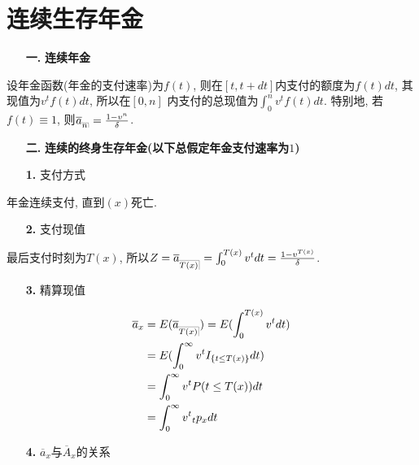 \documentclass[a4paper,10pt]{ctexbook}
\makeatletter
\newcommand{\hei}{\CJKfamily{hei}}      %
\DeclareRobustCommand{\annu}[1]{_{%
    \def\arraystretch{0}%
    \setlength\arraycolsep{1pt}%
    \setlength\arrayrulewidth{.2pt}%
    \begin{array}[b]{@{}c|}\hline
        \\[\arraycolsep]%
        \scriptstyle #1%
    \end{array}%
}}
\makeatother
\begin{document}
\section{连续生存年金}
\begin{itemize}
    \item[{\bf\hei 一.}]{\bf\hei 连续年金}
\end{itemize}

设年金函数(年金的支付速率)为$f(t)$, 则在$[t,t+dt]$内支付的额度为$f(t)dt$, 其现值为$v^tf(t)dt$, 所以在$[0,n]$ 内支付的总现值为$\int_0^n v^tf(t)dt$. 特别地, 若$f(t) \equiv 1$, 则$\overline{a}_{\annu n} = \frac{1-v^n}{\delta}$.

\begin{itemize}
    \item[{\bf\hei 二.}]{\bf\hei 连续的终身生存年金(以下总假定年金支付速率为$1$)}
\end{itemize}

\begin{itemize}
    \item[{\bf\hei 1.}] 支付方式
\end{itemize}

年金连续支付, 直到$(x)$死亡.

\begin{itemize}
    \item[{\bf\hei 2.}] 支付现值
\end{itemize}

最后支付时刻为$T(x)$, 所以$Z = \overline{a}_{\annu{T(x)}} = \int_0^{T(x)} v^tdt = \frac{1-v^{T(x)}}{\delta}$.

\begin{itemize}
    \item[{\bf\hei 3.}] 精算现值
\end{itemize}

\begin{align*}
    \overline{a}_x & = E(\overline{a}_{\annu{T(x)}}) = E(\int_0^{T(x)} v^tdt) \\
                   & = E(\int_0^{\infty} v^tI_{\{t \leq T(x)\}}dt)            \\
                   & = \int_0^{\infty} v^tP(t \leq T(x))dt                    \\
                   & = \int_0^{\infty} v^t{}_{t}p_xdt
\end{align*}

\begin{itemize}
    \item[{\bf\hei 4.}] $\overline{a}_x$与$\overline{A}_x$的关系
\end{itemize}
\end{document}
